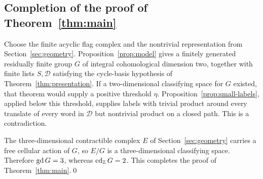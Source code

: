 \subsection*{Completion of the proof of Theorem~\ref{thm:main}}

Choose the finite acyclic flag complex and the nontrivial representation from Section~\ref{sec:geometry}. Proposition~\ref{prop:model} gives a finitely generated residually finite group $G$ of integral cohomological dimension two, together with finite lists $S,\mathcal D$ satisfying the cycle-basis hypothesis of Theorem~\ref{thm:presentation}. If a two-dimensional classifying space for $G$ existed, that theorem would supply a positive threshold $\eta$. Proposition~\ref{prop:small-labels}, applied below this threshold, supplies labels with trivial product around every translate of every word in $\mathcal D$ but nontrivial product on a closed path. This is a contradiction.

The three-dimensional contractible complex $E$ of Section~\ref{sec:geometry} carries a free cellular action of $G$, so $E/G$ is a three-dimensional classifying space. Therefore $\operatorname{gd} G=3$, whereas $\operatorname{cd}_{\mathbb Z} G=2$. This completes the proof of Theorem~\ref{thm:main}.\qed
